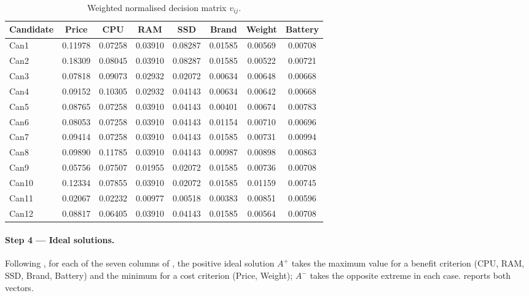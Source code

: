 \begin{table}[htbp]
\centering
\caption{Weighted normalised decision matrix $v_{ij}$.}
\label{tab:topsis-weighted}
\begin{tabular}{@{}lccccccc@{}}
\toprule
Candidate & Price & CPU & RAM & SSD & Brand & Weight & Battery \\
\midrule
Can1  & 0.11978 & 0.07258 & 0.03910 & 0.08287 & 0.01585 & 0.00569 & 0.00708 \\
Can2  & 0.18309 & 0.08045 & 0.03910 & 0.08287 & 0.01585 & 0.00522 & 0.00721 \\
Can3  & 0.07818 & 0.09073 & 0.02932 & 0.02072 & 0.00634 & 0.00648 & 0.00668 \\
Can4  & 0.09152 & 0.10305 & 0.02932 & 0.04143 & 0.00634 & 0.00642 & 0.00668 \\
Can5  & 0.08765 & 0.07258 & 0.03910 & 0.04143 & 0.00401 & 0.00674 & 0.00783 \\
Can6  & 0.08053 & 0.07258 & 0.03910 & 0.04143 & 0.01154 & 0.00710 & 0.00696 \\
Can7  & 0.09414 & 0.07258 & 0.03910 & 0.04143 & 0.01585 & 0.00731 & 0.00994 \\
Can8  & 0.09890 & 0.11785 & 0.03910 & 0.04143 & 0.00987 & 0.00898 & 0.00863 \\
Can9  & 0.05756 & 0.07507 & 0.01955 & 0.02072 & 0.01585 & 0.00736 & 0.00708 \\
Can10 & 0.12334 & 0.07855 & 0.03910 & 0.02072 & 0.01585 & 0.01159 & 0.00745 \\
Can11 & 0.02067 & 0.02232 & 0.00977 & 0.00518 & 0.00383 & 0.00851 & 0.00596 \\
Can12 & 0.08817 & 0.06405 & 0.03910 & 0.04143 & 0.01585 & 0.00564 & 0.00708 \\
\bottomrule
\end{tabular}
\end{table}

\paragraph{Step 4 --- Ideal solutions.}
Following , for each of the seven columns of ,
the positive ideal solution $A^{+}$ takes the maximum value for a benefit criterion (CPU,
RAM, SSD, Brand, Battery) and the minimum for a cost criterion (Price, Weight); $A^{-}$
takes the opposite extreme in each case.  reports both vectors.

